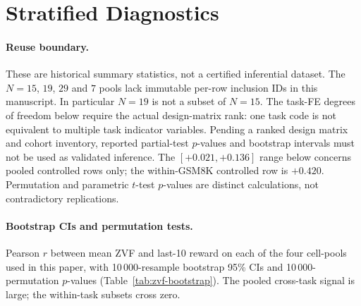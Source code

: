\section{Stratified Diagnostics}
\label{sec:stratified-diagnostics}

\paragraph{Reuse boundary.}
These are historical summary statistics, not a certified inferential dataset.
The $N=15$, $19$, $29$ and $7$ pools lack immutable per-row inclusion IDs in
this manuscript. In particular $N=19$ is not a subset of $N=15$.
The task-FE degrees of freedom below require the actual design-matrix rank:
one task code is not equivalent to multiple task indicator variables.
Pending a ranked design matrix and cohort inventory, reported partial-test
$p$-values and bootstrap intervals must not be used as validated inference.
The $[+0.021,+0.136]$ range below concerns pooled controlled rows only;
the within-GSM8K controlled row is $+0.420$. Permutation and parametric
$t$-test $p$-values are distinct calculations, not contradictory replications.

\paragraph{Bootstrap CIs and permutation tests.}
Pearson $r$ between mean ZVF and last-10 reward on each of the four cell-pools
used in this paper, with 10\,000-resample bootstrap 95\% CIs and
10\,000-permutation $p$-values (Table~\ref{tab:zvf-bootstrap}). The pooled
cross-task signal is large; the within-task subsets cross zero.

